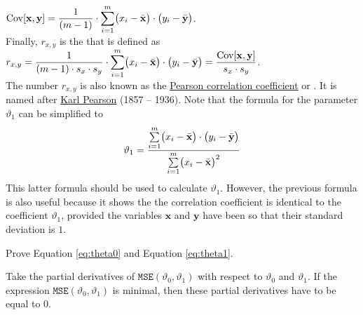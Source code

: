 \\[0.2cm]
\hspace*{1.3cm}
$\displaystyle \mathrm{Cov}[\mathbf{x}, \mathbf{y}] = \frac{1}{(m-1)} \cdot \sum\limits_{i=1}^m \bigl(x_i - \bar{\mathbf{x}}\bigr) \cdot \bigl(y_i - \bar{\mathbf{y}}\bigr)$.
\\[0.2cm]
Finally, $r_{x,y}$ is the  that is defined as
\\[0.2cm]
\hspace*{1.3cm}
$\displaystyle r_{x,y} = \frac{1}{(m-1) \cdot s_x \cdot s_y} \cdot \sum\limits_{i=1}^m \bigl(x_i - \bar{\mathbf{x}}\bigr) \cdot \bigl(y_i - \bar{\mathbf{y}}\bigr)
            = \frac{\mathrm{Cov}[\mathbf{x}, \mathbf{y}]}{s_x \cdot s_y}
$.
\\[0.2cm]
The number $r_{x,y}$ is also known as the
\href{https://en.wikipedia.org/wiki/Pearson_correlation_coefficient}{Pearson correlation coefficient} or
.  It is named after \href{https://en.wikipedia.org/wiki/Karl_Pearson}{Karl Pearson}
(1857 -- 1936).
Note that the formula for the parameter $\vartheta_1$ can be simplified to  
\begin{equation}
  \label{eq:theta1}
\displaystyle\vartheta_1 = \frac{\sum\limits_{i=1}^m \bigl(x_i - \bar{\mathbf{x}}\bigr) \cdot \bigl(y_i - \bar{\mathbf{y}}\bigr)}{
                        \sum\limits_{i=1}^m \bigl(x_i - \bar{\mathbf{x}}\bigr)^2}  
\end{equation}
This latter formula should be used to calculate $\vartheta_1$.  However, the previous formula is also useful
because it shows the the correlation coefficient is identical to the coefficient $\vartheta_1$, provided the variables $\mathbf{x}$ and
$\mathbf{y}$ have been  so that their standard deviation is $1$.

\exercise
Prove Equation \ref{eq:theta0} and Equation \ref{eq:theta1}.

\hint
Take the partial derivatives of $\mathtt{MSE}(\vartheta_0, \vartheta_1)$ with respect to $\vartheta_0$ and
$\vartheta_1$.  If the expression  $\mathtt{MSE}(\vartheta_0, \vartheta_1)$ is minimal, then these partial
derivatives have to be equal to $0$.
\eox

